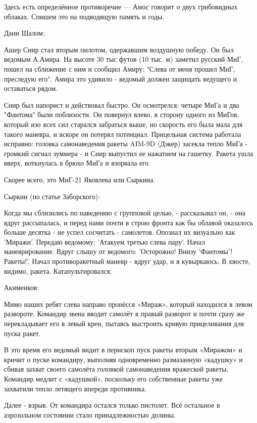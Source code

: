 Здесь есть определённое противоречие — Амос говорит о двух грибовидных облаках. Спишем это на подводящую память и годы.

Дани Шалом:

\begin{textcitation}
	Ашер Снир стал вторым пилотом, одержавшим воздушную победу. Он был ведомым А.Амира. На высоте 30 тыс футов (10 тыс. м) заметил русский МиГ, пошел на сближение с ним и сообщил Амиру: "Слева от меня прошел МиГ, преследую его". Амира это удивило - ведомый должен защищать ведущего и оставаться рядом.
	
	Снир был напорист и действовал быстро. Он осмотрелся: четыре МиГа и два "Фантома" были поблизости. Он повернул влево, в сторону одного из МиГов, который изо всех сил старался забраться выше, но скорость его была мала для такого маневра, и вскоре он потерял потенциал. Прицельная система работала исправно: головка самонаведения ракеты AIM-9D (Дэкер) засекла тепло МиГа - громкий сигнал зуммера - и Снир выпустил ее нажатием на гашетку. Ракета ушла вверх, воткнулась в брюхо МиГа и взорвала его. 
\end{textcitation}

Скорее всего, это МиГ-21 Яковлева или Сыркина.

Сыркин (по статье Заборского):

\begin{textcitation}
	Когда мы сблизились по наведению с групповой целью, - рассказывал он, - она вдруг рассыпалась, и перед нами почти в строю фронта как бы облавой оказалось больше десятка - не успел сосчитать - самолетов. Опознал их визуально как 'Миражи'. Передаю ведомому: 'Атакуем третью слева пару'. Начал маневрирование. Вдруг слышу от ведомого: 'Осторожно! Внизу 'Фантомы'! Ракеты!'. Начал противоракетный маневр - вдруг удар, и я кувыркаюсь. В хвосте, видимо, ракета. Катапультировался. 
\end{textcitation}

Акименков:

\begin{textcitation}
	Мимо наших ребят слева направо пронёсся «Мираж», который находился в левом развороте. Командир звена вводит самолёт в правый разворот и почти сразу же перекладывает его в левый крен, пытаясь выстроить кривую прицеливания для пуска ракет.
	
	В это время его ведомый видит в перископ пуск ракеты вторым «Миражом» и кричит о пуске командиру, выполняя одновременно размазанную «кадушку» и сбивая захват своего самолёта головкой самонаведения вражеской ракеты. Командир медлит с «кадушкой», поскольку его собственные ракеты уже захватили тепло летящего впереди противника.
	
	Далее - взрыв. От командира остался только пистолет. Всё остальное в аэрозольном состоянии стало принадлежностью долины.
\end{textcitation}


